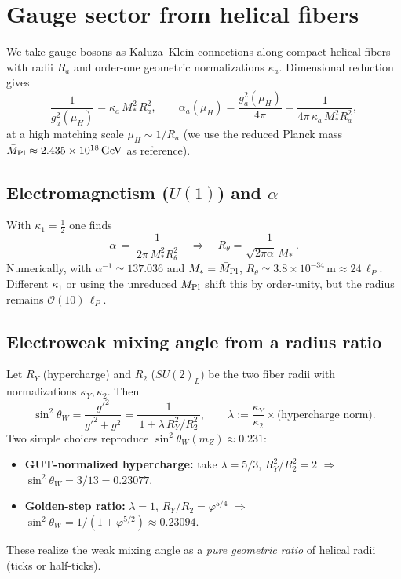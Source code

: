\documentclass[11pt]{article}
\begin{document}
\section{Gauge sector from helical fibers}\label{sec:gauge}
We take gauge bosons as Kaluza--Klein connections along compact helical fibers with radii \(R_a\) and order-one geometric normalizations \(\kappa_a\). Dimensional reduction gives
\begin{equation}\label{eq:gauge-kin}
\frac{1}{g_a^2(\mu_H)}=\kappa_a\, M_*^2\, R_a^2,\qquad \alpha_a(\mu_H)=\frac{g_a^2(\mu_H)}{4\pi}=\frac{1}{4\pi\,\kappa_a\,M_*^2 R_a^2},
\end{equation}
at a high matching scale \(\mu_H\sim 1/R_a\) (we use the reduced Planck mass \(\bar M_{\rm Pl}\approx 2.435\times 10^{18}\,\mathrm{GeV}\) as reference).

\subsection{Electromagnetism (\(U(1)\)) and \(\alpha\)}
With \(\kappa_1=\tfrac12\) one finds
\begin{equation}
\alpha\ =\ \frac{1}{2\pi\,M_*^2 R_\theta^2}\quad\Rightarrow\quad
R_\theta=\frac{1}{\sqrt{2\pi\alpha}\,M_*}\,.
\end{equation}
Numerically, with \(\alpha^{-1}\simeq 137.036\) and \(M_*=\bar M_{\rm Pl}\), \(R_\theta\simeq 3.8\times 10^{-34}\,\mathrm{m}\approx 24\,\ell_P\).
Different \(\kappa_1\) or using the unreduced \(M_{\rm Pl}\) shift this by order-unity, but the radius remains \(\mathcal{O}(10)\,\ell_P\).

\subsection{Electroweak mixing angle from a radius ratio}
Let \(R_Y\) (hypercharge) and \(R_2\) (\(SU(2)_L\)) be the two fiber radii with normalizations \(\kappa_Y,\kappa_2\).
Then
\begin{equation}
\sin^2\theta_W=\frac{g'^2}{g'^2+g^2}=\frac{1}{\,1+\lambda\,R_Y^2/R_2^2\,},\qquad \lambda:=\frac{\kappa_Y}{\kappa_2}\times\text{(hypercharge norm)}.
\end{equation}
Two simple choices reproduce \(\sin^2\theta_W(m_Z)\approx 0.231\):
\begin{itemize}
\item \textbf{GUT-normalized hypercharge:} take \(\lambda=5/3\), \(R_Y^2/R_2^2=2\) \(\Rightarrow\) \(\sin^2\theta_W=3/13=0.23077\).
\item \textbf{Golden-step ratio:} \(\lambda=1\), \(R_Y/R_2=\varphi^{5/4}\) \(\Rightarrow\) \(\sin^2\theta_W=1/(1+\varphi^{5/2})\approx 0.23094\).
\end{itemize}
These realize the weak mixing angle as a \emph{pure geometric ratio} of helical radii (ticks or half-ticks).
\end{document}
